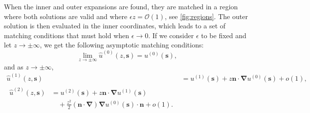 \documentclass[11pt,b5paper,DIV=calc,BCOR1.3cm,headings=small,%
               footinclude=false,headsepline]{scrbook}
\newcommand*{\vct}[1]{\ensuremath{\boldsymbol{#1}}}
\newcommand*{\del}{\boldsymbol\nabla}
\newcommand*{\grad}{\del}
\newcommand*{\bigo}[1]{\ensuremath{\mathcal O\left(#1\right)}}
\newcommand*{\smallo}[1]{\ensuremath{o\left(#1\right)}}
\newcommand*{\zlimpm}{\ensuremath{\lim_{z\to\pm\infty}}}
\newcommand*{\ndot}{\ensuremath{\vct n\cdot}}
\begin{document}
When the inner and outer expansions are found, they are matched in a region
where both solutions are valid and where $\epsilon z = \bigo 1$, see
\cref{fig:regions}.  The outer solution is then evaluated in the inner
coordinates, which leads to a set of matching conditions that must hold when
$\epsilon\to 0$.  If we consider $\epsilon$ to be fixed and let $z \to
\pm\infty$, we get the following asymptotic matching conditions:
\begin{equation}
  \label{eq:match1}
  \zlimpm \hat u^{(0)}(z,\vct s) = u^{(0)}(\vct s),
\end{equation}
and as $z \to \pm\infty$,
\begin{align}
  \label{eq:match2}
  \hat u^{(1)}(z,\vct s) &= u^{(1)}(\vct s)
    + z\ndot\grad u^{(0)}(\vct s) + \smallo 1, \\
  \begin{split}
    \hat u^{(2)}(z,\vct s) &= u^{(2)}(\vct s)
      + z\ndot\grad u^{(1)}(\vct s) \\
      &\quad + \frac{z^2}{2} (\ndot\grad)\grad u^{(0)}(\vct s)\cdot\vct n
      + \smallo 1.
    \label{eq:match3}
  \end{split}
\end{align}
\end{document}
